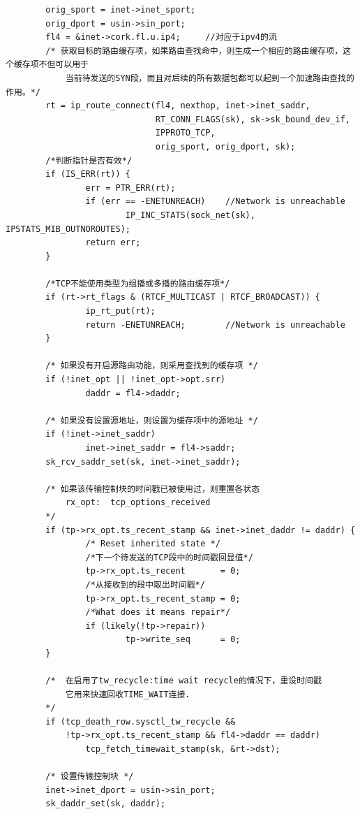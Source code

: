 \begin{verbatim}
        orig_sport = inet->inet_sport;
        orig_dport = usin->sin_port;
        fl4 = &inet->cork.fl.u.ip4;     //对应于ipv4的流
        /* 获取目标的路由缓存项，如果路由查找命中，则生成一个相应的路由缓存项，这个缓存项不但可以用于
            当前待发送的SYN段，而且对后续的所有数据包都可以起到一个加速路由查找的作用。*/
        rt = ip_route_connect(fl4, nexthop, inet->inet_saddr,
                              RT_CONN_FLAGS(sk), sk->sk_bound_dev_if,
                              IPPROTO_TCP,
                              orig_sport, orig_dport, sk);
        /*判断指针是否有效*/        
        if (IS_ERR(rt)) {
                err = PTR_ERR(rt);
                if (err == -ENETUNREACH)    //Network is unreachable
                        IP_INC_STATS(sock_net(sk), IPSTATS_MIB_OUTNOROUTES);
                return err;
        }

        /*TCP不能使用类型为组播或多播的路由缓存项*/
        if (rt->rt_flags & (RTCF_MULTICAST | RTCF_BROADCAST)) {
                ip_rt_put(rt);
                return -ENETUNREACH;        //Network is unreachable
        }

        /* 如果没有开启源路由功能，则采用查找到的缓存项 */
        if (!inet_opt || !inet_opt->opt.srr)
                daddr = fl4->daddr;

        /* 如果没有设置源地址，则设置为缓存项中的源地址 */
        if (!inet->inet_saddr)
                inet->inet_saddr = fl4->saddr;
        sk_rcv_saddr_set(sk, inet->inet_saddr);

        /* 如果该传输控制块的时间戳已被使用过，则重置各状态 
            rx_opt:  tcp_options_received
        */
        if (tp->rx_opt.ts_recent_stamp && inet->inet_daddr != daddr) {
                /* Reset inherited state */
                /*下一个待发送的TCP段中的时间戳回显值*/
                tp->rx_opt.ts_recent       = 0;     
                /*从接收到的段中取出时间戳*/
                tp->rx_opt.ts_recent_stamp = 0;
                /*What does it means repair*/       
                if (likely(!tp->repair))
                        tp->write_seq      = 0;
        }

        /*  在启用了tw_recycle:time wait recycle的情况下，重设时间戳 
            它用来快速回收TIME_WAIT连接.
        */
        if (tcp_death_row.sysctl_tw_recycle &&
            !tp->rx_opt.ts_recent_stamp && fl4->daddr == daddr)
                tcp_fetch_timewait_stamp(sk, &rt->dst);

        /* 设置传输控制块 */
        inet->inet_dport = usin->sin_port;
        sk_daddr_set(sk, daddr);


\end{verbatim}
